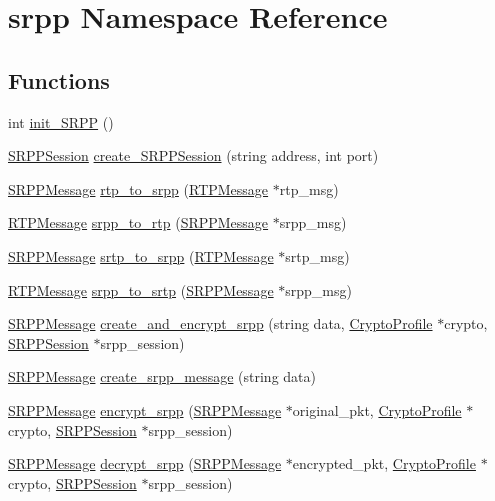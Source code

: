 \hypertarget{namespacesrpp}{
\section{srpp Namespace Reference}
\label{namespacesrpp}
}
\subsection*{Functions}
\begin{DoxyCompactItemize}
\item 
int \hyperlink{namespacesrpp_a8034bd54b6c3689cea2030fc208e372c}{init\_\-SRPP} ()
\item 
\hyperlink{class_s_r_p_p_session}{SRPPSession} \hyperlink{namespacesrpp_a8a85c1bdf3b2dbc45b48e485399482a7}{create\_\-SRPPSession} (string address, int port)
\item 
\hyperlink{class_s_r_p_p_message}{SRPPMessage} \hyperlink{namespacesrpp_a177dc3d8977584c43874f34fe0afabfc}{rtp\_\-to\_\-srpp} (\hyperlink{class_r_t_p_message}{RTPMessage} $\ast$rtp\_\-msg)
\item 
\hyperlink{class_r_t_p_message}{RTPMessage} \hyperlink{namespacesrpp_ace8256ed4a8da891d842dc82e9747d31}{srpp\_\-to\_\-rtp} (\hyperlink{class_s_r_p_p_message}{SRPPMessage} $\ast$srpp\_\-msg)
\item 
\hyperlink{class_s_r_p_p_message}{SRPPMessage} \hyperlink{namespacesrpp_a2dc275aa82c32a995b8d9d33de00ecfa}{srtp\_\-to\_\-srpp} (\hyperlink{class_r_t_p_message}{RTPMessage} $\ast$srtp\_\-msg)
\item 
\hyperlink{class_r_t_p_message}{RTPMessage} \hyperlink{namespacesrpp_a2bf678c0bec2ec54e269523236390971}{srpp\_\-to\_\-srtp} (\hyperlink{class_s_r_p_p_message}{SRPPMessage} $\ast$srpp\_\-msg)
\item 
\hyperlink{class_s_r_p_p_message}{SRPPMessage} \hyperlink{namespacesrpp_a4ab1aebaf102fe3b46f250237a4e4f59}{create\_\-and\_\-encrypt\_\-srpp} (string data, \hyperlink{class_crypto_profile}{CryptoProfile} $\ast$crypto, \hyperlink{class_s_r_p_p_session}{SRPPSession} $\ast$srpp\_\-session)
\item 
\hyperlink{class_s_r_p_p_message}{SRPPMessage} \hyperlink{namespacesrpp_ae6f1d8d88738a904e0a72bb93837c60f}{create\_\-srpp\_\-message} (string data)
\item 
\hyperlink{class_s_r_p_p_message}{SRPPMessage} \hyperlink{namespacesrpp_adac1bae57907c468dda2ad2e546199e8}{encrypt\_\-srpp} (\hyperlink{class_s_r_p_p_message}{SRPPMessage} $\ast$original\_\-pkt, \hyperlink{class_crypto_profile}{CryptoProfile} $\ast$crypto, \hyperlink{class_s_r_p_p_session}{SRPPSession} $\ast$srpp\_\-session)
\item 
\hyperlink{class_s_r_p_p_message}{SRPPMessage} \hyperlink{namespacesrpp_a6385520ec7f4bb8c51595b66ad87f5de}{decrypt\_\-srpp} (\hyperlink{class_s_r_p_p_message}{SRPPMessage} $\ast$encrypted\_\-pkt, \hyperlink{class_crypto_profile}{CryptoProfile} $\ast$crypto, \hyperlink{class_s_r_p_p_session}{SRPPSession} $\ast$srpp\_\-session)
\end{DoxyCompactItemize}


